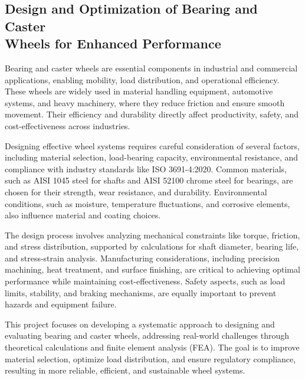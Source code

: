 \documentclass[../../main]{subfiles}
\begin{document}
\subsection[Bearing and Caster Wheel Design]{Design and Optimization of Bearing and Caster\\ Wheels for Enhanced Performance}

Bearing and caster wheels are essential components in industrial and commercial applications, enabling mobility, load distribution, and operational efficiency. These wheels are widely used in material handling equipment, automotive systems, and heavy machinery, where they reduce friction and ensure smooth movement. Their efficiency and durability directly affect productivity, safety, and cost-effectiveness across industries.

Designing effective wheel systems requires careful consideration of several factors, including material selection, load-bearing capacity, environmental resistance, and compliance with industry standards like ISO 3691-4:2020. Common materials, such as AISI 1045 steel for shafts and AISI 52100 chrome steel for bearings, are chosen for their strength, wear resistance, and durability. Environmental conditions, such as moisture, temperature fluctuations, and corrosive elements, also influence material and coating choices.

The design process involves analyzing mechanical constraints like torque, friction, and stress distribution, supported by calculations for shaft diameter, bearing life, and stress-strain analysis. Manufacturing considerations, including precision machining, heat treatment, and surface finishing, are critical to achieving optimal performance while maintaining cost-effectiveness. Safety aspects, such as load limits, stability, and braking mechanisms, are equally important to prevent hazards and equipment failure.

This project focuses on developing a systematic approach to designing and evaluating bearing and caster wheels, addressing real-world challenges through theoretical calculations and finite element analysis (FEA). The goal is to improve material selection, optimize load distribution, and ensure regulatory compliance, resulting in more reliable, efficient, and sustainable wheel systems.

\end{document}
